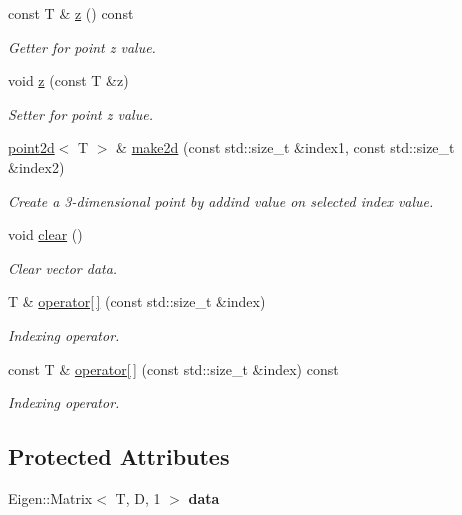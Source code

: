 \begin{DoxyCompactItemize}
const T \& \hyperlink{classacme_1_1point3d_acbea0b411604f8da4f690e09e2401743}{z} () const
\begin{DoxyCompactList}\small\item\em Getter for point z value. \end{DoxyCompactList}\item 
void \hyperlink{classacme_1_1point3d_aad69f4d32ffafffd008214c361fa843f}{z} (const T \&z)
\begin{DoxyCompactList}\small\item\em Setter for point z value. \end{DoxyCompactList}\item 
\hyperlink{classacme_1_1point2d}{point2d}$<$ T $>$ \& \hyperlink{classacme_1_1point3d_a724a96c6ad4aa84b0236a8113d99d4a4}{make2d} (const std\+::size\+\_\+t \&index1, const std\+::size\+\_\+t \&index2)
\begin{DoxyCompactList}\small\item\em Create a 3-\/dimensional point by addind value on selected index value. \end{DoxyCompactList}\item 
\mbox{\label{classacme_1_1pointnd_a2d0b84e609dc1ad5cbbe631c5bb5791f}} 
void \hyperlink{classacme_1_1pointnd_a2d0b84e609dc1ad5cbbe631c5bb5791f}{clear} ()
\begin{DoxyCompactList}\small\item\em Clear vector data. \end{DoxyCompactList}\item 
T \& \hyperlink{classacme_1_1pointnd_a35b0691673728d98d455c007612d6b91}{operator\mbox{[}$\,$\mbox{]}} (const std\+::size\+\_\+t \&index)
\begin{DoxyCompactList}\small\item\em Indexing operator. \end{DoxyCompactList}\item 
const T \& \hyperlink{classacme_1_1pointnd_a565e9ed195c8f8dadc570a029a3deb94}{operator\mbox{[}$\,$\mbox{]}} (const std\+::size\+\_\+t \&index) const
\begin{DoxyCompactList}\small\item\em Indexing operator. \end{DoxyCompactList}\end{DoxyCompactItemize}
\subsection*{Protected Attributes}
\begin{DoxyCompactItemize}
\item 
\mbox{\label{classacme_1_1pointnd_a13b19080ed617e2a9c5d6058f07d4f4b}} 
Eigen\+::\+Matrix$<$ T, D, 1 $>$ {\bfseries data}
\end{DoxyCompactItemize}


